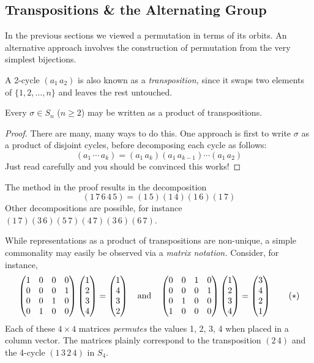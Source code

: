 \clearpage


\subsection{Transpositions \& the Alternating Group}\label{sec:transpositions}

In the previous sections we viewed a permutation in terms of its orbits. An alternative approach involves the construction of permutation from the very simplest bijections.

\begin{defn}{}{}
	A 2-cycle $(a_1\,a_2)$ is also known as a \emph{transposition,} since it swaps two elements of $\{1,2,\ldots,n\}$ and leaves the rest untouched.
\end{defn}


\begin{thm}{}{}
	Every $\sigma\in S_n$ ($n\ge 2$) may be written as a product of transpositions.
\end{thm}

\begin{proof}
	There are many, many ways to do this. One approach is first to write $\sigma$ as a product of disjoint cycles, before decomposing each cycle as follows:
	\[
		(a_1\,\cdots\, a_k)=(a_1\,a_k)(a_1\,a_{k-1})\cdots (a_1\,a_2)
	\]
	Just read carefully and you should be convinced this works!
\end{proof}

\begin{example}{}{}
	The method in the proof results in the decomposition
	\[
		(1\,7\,6\,4\,5)=(1\,5)(1\,4)(1\,6)(1\,7)
	\]
	Other decompositions are possible, for instance $(1\,7)(3\,6)(5\,7)(4\,7)(3\,6)(6\,7)$.
\end{example}

While representations as a product of transpositions are non-unique, a simple commonality may easily be observed via a \emph{matrix notation.} Consider, for instance,
\[
	\begin{pmatrix}
		1&0&0&0\\ 0&0&0&1\\ 0&0&1&0\\ 0&1&0&0
	\end{pmatrix}
	\begin{pmatrix}1\\2\\3\\4\end{pmatrix}
	=\begin{pmatrix}1\\4\\3\\2\end{pmatrix}\quad\text{and}\quad
	\begin{pmatrix}
		0&0&1&0\\ 0&0&0&1\\  0&1&0&0\\ 1&0&0&0
	\end{pmatrix}
	\begin{pmatrix}1\\2\\3\\4\end{pmatrix}
	=\begin{pmatrix}3\\4\\2\\1\end{pmatrix}\tag{$\ast$}
\] 
Each of these $4\times 4$ matrices \emph{permutes} the values 1, 2, 3, 4 when placed in a column vector. The matrices plainly correspond to the transposition $(2\,4)$ and the 4-cycle $(1\,3\,2\,4)$ in $S_4$.

